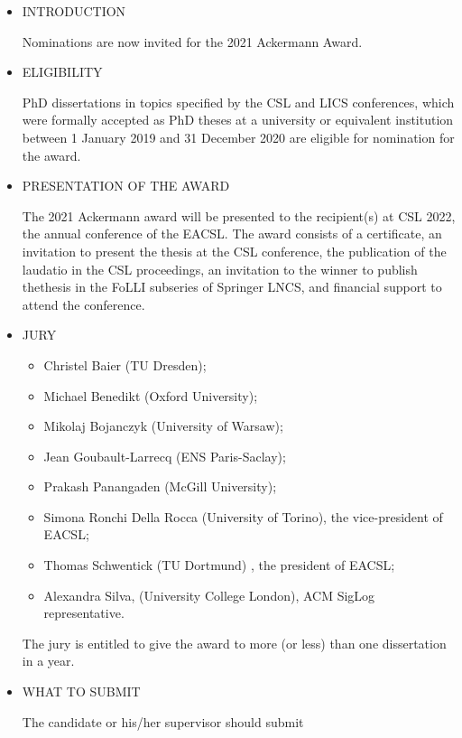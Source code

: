\documentclass{article}
\begin{document}
\begin{itemize}\item  INTRODUCTION 
 
  Nominations are now invited for the 2021 Ackermann Award. 
 
\item  ELIGIBILITY 
 
  PhD dissertations in topics specified by the CSL and LICS conferences, which were formally accepted as PhD theses at a university or equivalent institution between 1 January 2019 and 31 December 2020 are eligible for nomination for the award. 
 
\item  PRESENTATION OF THE AWARD  
 
  The 2021 Ackermann award will be presented to the recipient(s) at CSL 2022, the annual conference of the EACSL.  The award consists of a certificate, an invitation to present the thesis at the CSL conference, the publication of the laudatio in the CSL proceedings, an invitation to the winner to publish thethesis in the FoLLI subseries of Springer LNCS, and  financial support to attend the conference. 
 
\item  JURY 
 
\begin{itemize}\item  Christel Baier (TU Dresden);
\item  Michael Benedikt (Oxford University);
\item  Mikolaj Bojanczyk (University of Warsaw);
\item  Jean Goubault-Larrecq (ENS Paris-Saclay);
\item  Prakash Panangaden (McGill University);
\item  Simona Ronchi Della Rocca (University of Torino), the vice-president of EACSL;
\item  Thomas Schwentick (TU Dortmund) , the president of EACSL;
\item  Alexandra Silva, (University College London), ACM SigLog representative.
\end{itemize} 
 The jury is entitled to give the award to more (or less) than one dissertation in a year. 
 
\item  WHAT TO SUBMIT 
 
  The candidate or his/her supervisor should submit 
 

\end{itemize}
\end{document}
